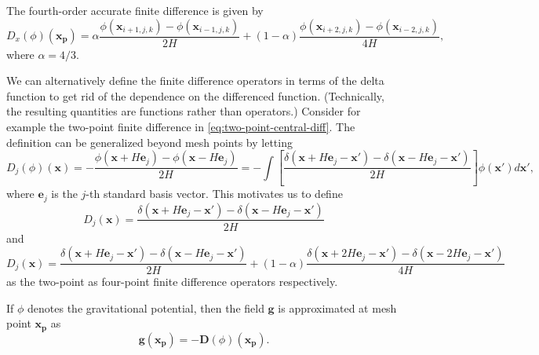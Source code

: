 The fourth-order accurate finite difference is given by
\begin{equation*}
    D_x(\phi)(\mathbf{x}_\mathbf{p}) = \alpha\frac{\phi(\mathbf{x}_{i+1,j,k}) - \phi(\mathbf{x}_{i-1,j,k})}{2H} + (1-\alpha)\frac{\phi(\mathbf{x}_{i+2,j,k}) - \phi(\mathbf{x}_{i-2,j,k})}{4H},
\end{equation*}
where $\alpha = 4/3$.

We can alternatively define the finite difference operators in terms of the delta function to get rid of the dependence on the differenced function. (Technically, the resulting quantities are functions rather than operators.)
Consider for example the two-point finite difference in \autoref{eq:two-point-central-diff}.
The definition can be generalized beyond mesh points by letting
\begin{equation*}
    D_j(\phi)(\mathbf{x}) = -\frac{\phi(\mathbf{x} + H \mathbf{e}_j)-\phi (\mathbf{x} - H \mathbf{e}_j)}{2H} = -\int \left[ \frac{\delta(\mathbf{x} + H\mathbf{e}_j - \mathbf{x}') - \delta(\mathbf{x} - H\mathbf{e}_j - \mathbf{x}')}{2H} \right]\phi(\mathbf{x}')d\mathbf{x}',
\end{equation*}
where $\mathbf{e}_j$ is the $j$-th standard basis vector.
This motivates us to define
\begin{equation}\label{eq:two-point-central-diff}
    D_j(\mathbf{x}) = \frac{\delta(\mathbf{x} + H\mathbf{e}_j - \mathbf{x}') - \delta(\mathbf{x} - H\mathbf{e}_j - \mathbf{x}')}{2H}
\end{equation}
and
\begin{equation}\label{eq:four-point-central-diff}
    D_j(\mathbf{x}) = \frac{\delta(\mathbf{x} + H\mathbf{e}_j - \mathbf{x}') - \delta(\mathbf{x} - H\mathbf{e}_j - \mathbf{x}')}{2H} + (1-\alpha)\frac{\delta(\mathbf{x} + 2H\mathbf{e}_j - \mathbf{x}') - \delta(\mathbf{x} - 2H\mathbf{e}_j - \mathbf{x}')}{4H}
\end{equation}
as the two-point as four-point finite difference operators respectively.

If $\phi$ denotes the gravitational potential, then the field $\mathbf{g}$ is approximated at mesh point $\mathbf{x}_\mathbf{p}$ as
\begin{equation*}
    \mathbf{g}(\mathbf{x}_\mathbf{p}) = -\mathbf{D}(\phi)(\mathbf{x}_\mathbf{p}).
\end{equation*}

